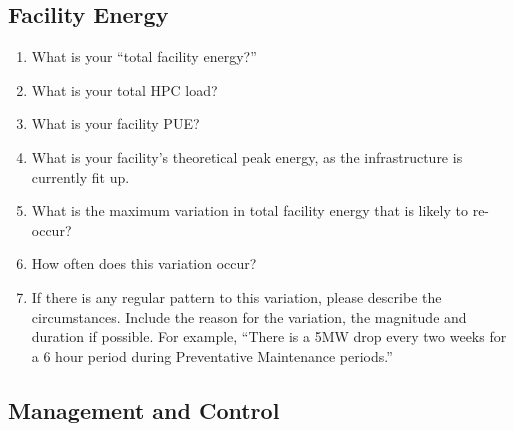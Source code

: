 \subsection*{Facility Energy}
\begin{enumerate}  [nosep]
\item
What is your ``total facility energy?''

\item
What is your total HPC load?

\item
What is your facility PUE?

\item
What is your facility's theoretical peak energy, as the infrastructure is currently fit up.

\item
What is the maximum variation in total facility energy that is likely to re-occur? 

\item
 How often does this variation occur?

\item
If there is any regular pattern to this variation, please describe the circumstances. 
Include the reason for the variation, the magnitude and duration if possible. 
For example, ``There is a 5MW drop every two weeks for a 6 hour period during Preventative 
Maintenance periods.''
\end{enumerate}

\subsection*{Management and Control}

